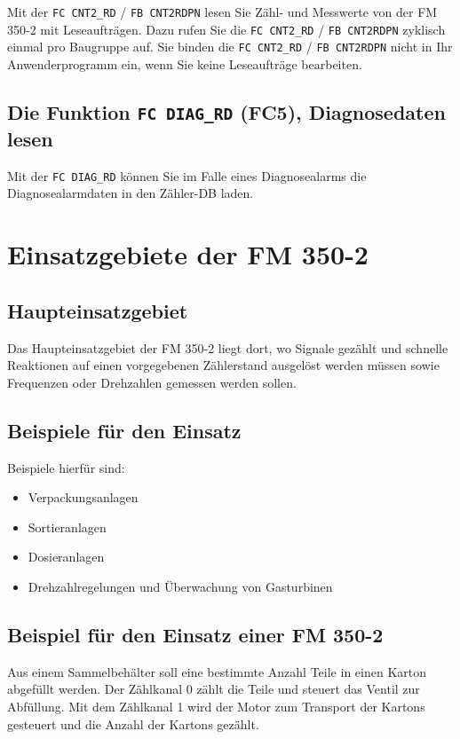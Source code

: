 Mit der \texttt{FC CNT2\_RD} / \texttt{FB CNT2RDPN} lesen Sie Zähl- und Messwerte von der FM 350-2 
mit Leseaufträgen. Dazu rufen Sie die \texttt{FC CNT2\_RD} / \texttt{FB CNT2RDPN} zyklisch einmal pro 
Baugruppe auf.  
Sie binden die \texttt{FC CNT2\_RD} / \texttt{FB CNT2RDPN} nicht in Ihr Anwenderprogramm ein, wenn 
Sie keine Leseaufträge bearbeiten.

\subsection{Die Funktion \texttt{FC DIAG\_RD} (FC5), Diagnosedaten lesen}

Mit der \texttt{FC DIAG\_RD} können Sie im Falle eines Diagnosealarms die Diagnosealarmdaten in 
den Zähler-DB laden.


\section{Einsatzgebiete der FM 350-2}

\subsection{Haupteinsatzgebiet} Das Haupteinsatzgebiet der FM 350-2 liegt dort, wo Signale gezählt und schnelle Reaktionen auf einen vorgegebenen Zählerstand ausgelöst werden müssen sowie Frequenzen oder Drehzahlen gemessen werden sollen.

\subsection{Beispiele für den Einsatz} Beispiele hierfür sind: \begin{itemize} \item Verpackungsanlagen \item Sortieranlagen \item Dosieranlagen \item Drehzahlregelungen und Überwachung von Gasturbinen \end{itemize}

\subsection{Beispiel für den Einsatz einer FM 350-2} Aus einem Sammelbehälter soll eine bestimmte Anzahl Teile in einen Karton abgefüllt werden. Der Zählkanal 0 zählt die Teile und steuert das Ventil zur Abfüllung. Mit dem Zählkanal 1 wird der Motor zum Transport der Kartons gesteuert und die Anzahl der Kartons gezählt.

